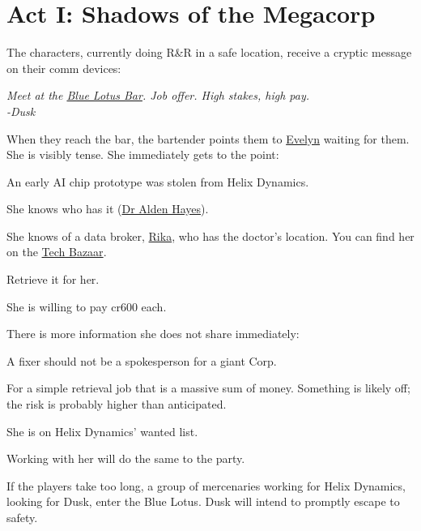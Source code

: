 \chapter{Act I: Shadows of the Megacorp} %
\label{ch:act1}
\vspace{-10mm} %
The characters, currently doing R\&R in a safe location,
receive a cryptic message on their comm devices:
\begin{exampleblock}
	\itshape
	Meet at the \hyperref[location:bar]{Blue Lotus Bar}.
	Job offer. High stakes, high pay.
	\\%
	-Dusk
\end{exampleblock}
When they reach the bar, the bartender points them to \hyperref[char:dusk]{Evelyn} waiting for them.
She is visibly tense.
She immediately gets to the point:
\begin{sitemize}
	\item An early AI chip prototype was stolen from Helix Dynamics.
	\item She knows who has it (\hyperref[char:hayes]{Dr Alden Hayes}).
	\item She knows of a data broker, \hyperref[char:rika]{Rika},
		who has the doctor's location.
		You can find her on the \hyperref[location:techbazaar]{Tech Bazaar}.
	\item Retrieve it for her.
	\item She is willing to pay cr600 each.
\end{sitemize}
\vspace{-5mm}
There is more information she does not share immediately:
\begin{sitemize}
	\item A fixer should not be a spokesperson for a giant Corp.
	\item For a simple retrieval job that is a massive sum of money.
		Something is likely off; the risk is probably higher than anticipated.
	\item She is on Helix Dynamics' wanted list.
	\item Working with her will do the same to the party.
\end{sitemize}

If the players take too long,
	a group of mercenaries working for Helix Dynamics,
	looking for Dusk,
	enter the Blue Lotus.
Dusk will intend to promptly escape to safety.
